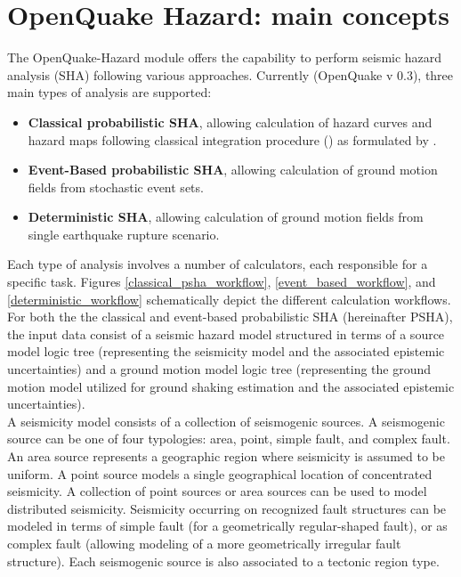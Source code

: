 \section{OpenQuake Hazard: main concepts}
The OpenQuake-Hazard module offers the capability to perform seismic hazard analysis (SHA) following various approaches. Currently (OpenQuake v 0.3), three main types of analysis are supported:
\begin{itemize}
\item \textbf{Classical probabilistic SHA}, allowing calculation of hazard curves and hazard maps  following classical integration procedure (\cite{cornell1968}) as formulated by \cite{field2003}.
\item \textbf{Event-Based probabilistic SHA}, allowing calculation of ground motion fields from stochastic event sets.
\item \textbf{Deterministic SHA}, allowing calculation of ground motion fields from single earthquake rupture scenario.
\end{itemize}
Each type of analysis involves a number of calculators, each responsible for a specific task. Figures \ref{classical_psha_workflow}, \ref{event_based_workflow}, and \ref{deterministic_workflow} schematically depict the different calculation workflows.\\
For both the the classical and event-based probabilistic SHA (hereinafter PSHA), the input data consist of a seismic hazard model structured in terms of a source model logic tree (representing the seismicity model and the associated epistemic uncertainties) and a ground motion model logic tree (representing the ground motion model utilized for ground shaking estimation and the associated epistemic uncertainties).\\
A seismicity model consists of a collection of seismogenic sources. A seismogenic source can be one of four typologies: area, point, simple fault, and complex fault. An area source represents a geographic region where seismicity is assumed to be uniform. A point source models a single geographical location of concentrated seismicity. A collection of point sources or area sources can be used to model distributed seismicity. Seismicity occurring on recognized fault structures can be modeled in terms of simple fault (for a geometrically regular-shaped fault), or as complex fault (allowing modeling of a more geometrically irregular fault structure). Each seismogenic source is also associated to a tectonic region type.\\
